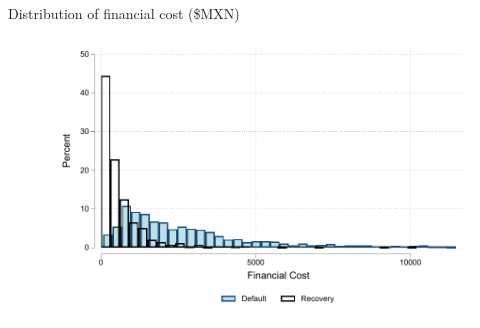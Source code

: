 \documentclass[8pt]{beamer}
\begin{document}
\begin{frame}{Distribution of financial cost (\$MXN)}
\label{fc_dist}
    \begin{figure}
     \centering
        \includegraphics[width=.8\textwidth]{Figuras/hist_fc.pdf}
    \end{figure}
    \hyperlink{fc_cost}{}
\end{frame}
\end{document}
